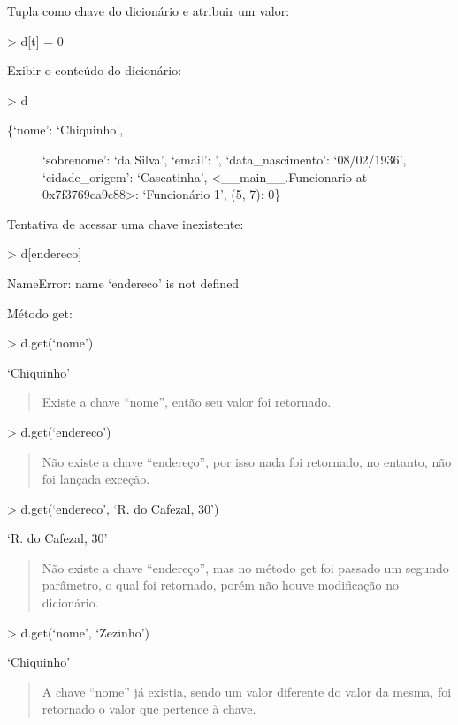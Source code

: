 \documentclass[letterpaper,10pt,brazil]{sphinxmanual}
\begin{document}
Tupla como chave do dicionário e atribuir um valor:

\textgreater{} d{[}t{]} = 0

Exibir o conteúdo do dicionário:

\textgreater{} d
\begin{description}
\item[{\{‘nome’: ‘Chiquinho’,}] \leavevmode
‘sobrenome’: ‘da Silva’,
‘email’: ’,
‘data\_nascimento’: ‘08/02/1936’,
‘cidade\_origem’: ‘Cascatinha’,
\textless{}\_\_main\_\_.Funcionario at 0x7f3769ca9c88\textgreater{}: ‘Funcionário 1’,
(5, 7): 0\}

\end{description}

Tentativa de acessar uma chave inexistente:

\textgreater{} d{[}endereco{]}

NameError: name ‘endereco’ is not defined

Método get:

\textgreater{} d.get(‘nome’)

‘Chiquinho’
\begin{quote}

Existe a chave “nome”, então seu valor foi retornado.
\end{quote}

\textgreater{} d.get(‘endereco’)
\begin{quote}

Não existe a chave “endereço”, por isso nada foi retornado, no entanto, não foi lançada exceção.
\end{quote}

\textgreater{} d.get(‘endereco’, ‘R. do Cafezal, 30’)

‘R. do Cafezal, 30’
\begin{quote}

Não existe a chave “endereço”, mas no método get foi passado um segundo parâmetro, o qual foi retornado, porém não houve modificação no dicionário.
\end{quote}

\textgreater{} d.get(‘nome’, ‘Zezinho’)

‘Chiquinho’
\begin{quote}

A chave “nome” já existia, sendo um valor diferente do valor da mesma, foi retornado o valor que pertence à chave.
\end{quote}
\end{document}

